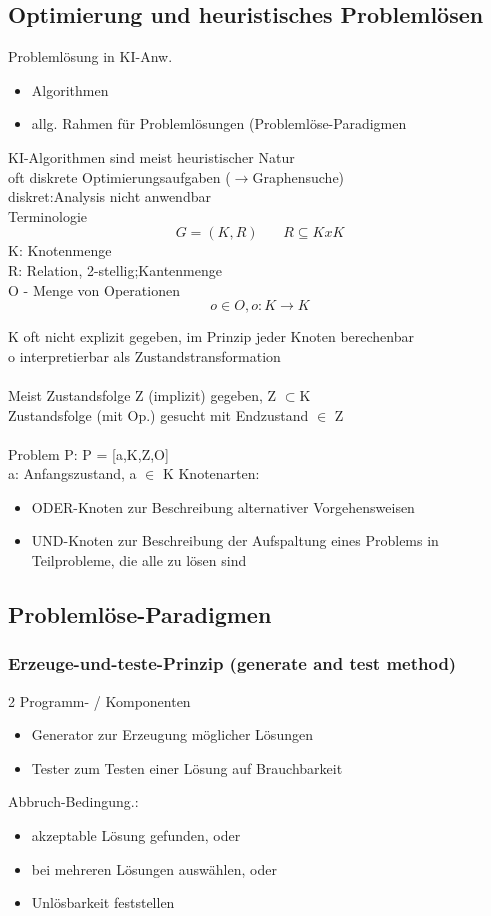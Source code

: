 \documentclass[a4paper,14pt]{article}
\begin{document}
\subsection{Optimierung und heuristisches Problemlösen}
Problemlösung in KI-Anw.
\begin{itemize}
 \item Algorithmen
 \item allg. Rahmen für Problemlösungen (Problemlöse-Paradigmen
\end{itemize}

KI-Algorithmen sind meist heuristischer Natur\\
oft diskrete Optimierungsaufgaben ($\rightarrow$Graphensuche)\\
diskret:Analysis nicht anwendbar\\
Terminologie
$$G = (K,R) ~~~~~~~~R\subseteq K x K $$
K: Knotenmenge\\
R: Relation, 2-stellig;Kantenmenge\\
O - Menge von Operationen
$$o\in O, o: K\rightarrow K$$

K oft nicht explizit gegeben, im Prinzip jeder Knoten berechenbar\\
o interpretierbar als Zustandstransformation\\
\\
Meist Zustandsfolge Z (implizit) gegeben, Z $\subset$K\\
Zustandsfolge (mit Op.) gesucht mit Endzustand $\in$ Z\\
\\
Problem P: P = [a,K,Z,O]\\
a: Anfangszustand, a $\in$ K
Knotenarten:
\begin{itemize}
 \item ODER-Knoten zur Beschreibung alternativer Vorgehensweisen
 \item UND-Knoten zur Beschreibung der Aufspaltung eines Problems in Teilprobleme, die alle zu lösen sind
\end{itemize}

\subsection{Problemlöse-Paradigmen}
\subsubsection{Erzeuge-und-teste-Prinzip (generate and test method)}
2 Programm- / Komponenten
\begin{itemize}
 \item Generator zur Erzeugung möglicher Lösungen
 \item Tester zum Testen einer Lösung auf Brauchbarkeit
\end{itemize}
Abbruch-Bedingung.:
\begin{itemize}
 \item akzeptable Lösung gefunden, oder
 \item bei mehreren Lösungen auswählen, oder
 \item Unlösbarkeit feststellen
\end{itemize}
\end{document}
